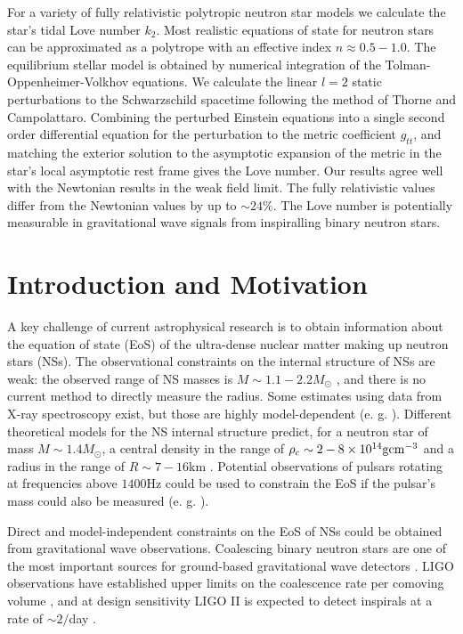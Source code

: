 \documentclass[12pt,preprint]{aastex}
\begin{document}
For a variety of fully relativistic polytropic neutron star models
we calculate the star's tidal Love number $k_2$. Most realistic
equations of state for neutron stars can be approximated as a
polytrope with an effective index $n\approx 0.5 - 1.0$. The
equilibrium stellar model is obtained by numerical integration of
the Tolman-Oppenheimer-Volkhov equations. We calculate the linear
$l=2$ static perturbations to the Schwarzschild spacetime following
the method of Thorne and Campolattaro. Combining the perturbed
Einstein equations into a single second order differential equation
for the perturbation to the metric coefficient $g_{tt}$, and
matching the exterior solution to the asymptotic expansion of the
metric in the star's local asymptotic rest frame gives the Love
number. Our results agree well with the Newtonian results in the
weak field limit. The fully relativistic values differ from the
Newtonian values by up to $\sim 24\%$. The Love number is
potentially measurable in gravitational wave signals from
inspiralling binary neutron stars.






\section{Introduction and Motivation}


A key challenge of current astrophysical research is to obtain
information about the equation of state (EoS) of the ultra-dense
nuclear matter making up neutron stars (NSs). The observational
constraints on the internal structure of NSs are weak: the observed
range of NS masses is $M\sim 1.1 - 2.2 M_\odot$ \citep{Lattimer},
and there is no current method to directly measure the radius. Some
estimates using data from X-ray spectroscopy exist, but those are
highly model-dependent  (e. g. \citet{astroph}). Different
theoretical models for the NS internal structure predict, for a
neutron star of mass $M\sim 1.4 M_\odot$, a central density in the
range of $ \rho_c\sim 2-8 \times 10^{14}{\rm g}{\rm cm}^{-3}$ and a
radius in the range of $R\sim 7-16$km \citep{Lattimer}. Potential
observations of pulsars rotating at frequencies above $1400$Hz could
be used to constrain the EoS if the pulsar's mass could also be
measured (e. g. \citet{Bejger}).



Direct and model-independent constraints on the EoS of NSs could be
obtained from gravitational wave observations. Coalescing binary
neutron stars are one of the most important sources for ground-based
gravitational wave detectors \citep{Cutler:2002me}. LIGO
observations have established upper limits on the coalescence rate
per comoving volume \citep{Abbott:2007xi}, and at design sensitivity
LIGO II is expected to detect inspirals at a rate of $\sim 2/$day
\citep{2004ApJ...601...L179}.
\end{document}
